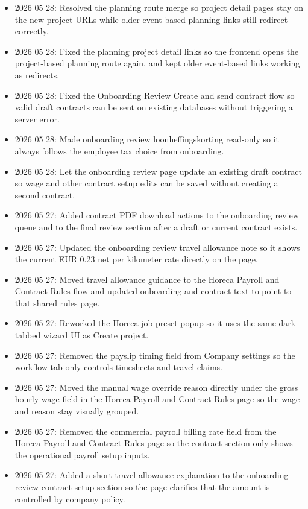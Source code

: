 \documentclass[11pt]{article}
\begin{document}
\begin{itemize}
    \item 2026 05 28: Resolved the planning route merge so project detail pages stay on the new project URLs while older event-based planning links still redirect correctly.
    \item 2026 05 28: Fixed the planning project detail links so the frontend opens the project-based planning route again, and kept older event-based links working as redirects.
    \item 2026 05 28: Fixed the Onboarding Review Create and send contract flow so valid draft contracts can be sent on existing databases without triggering a server error.
    \item 2026 05 28: Made onboarding review loonheffingskorting read-only so it always follows the employee tax choice from onboarding.
    \item 2026 05 28: Let the onboarding review page update an existing draft contract so wage and other contract setup edits can be saved without creating a second contract.
    \item 2026 05 27: Added contract PDF download actions to the onboarding review queue and to the final review section after a draft or current contract exists.
    \item 2026 05 27: Updated the onboarding review travel allowance note so it shows the current EUR 0.23 net per kilometer rate directly on the page.
    \item 2026 05 27: Moved travel allowance guidance to the Horeca Payroll and Contract Rules flow and updated onboarding and contract text to point to that shared rules page.
    \item 2026 05 27: Reworked the Horeca job preset popup so it uses the same dark tabbed wizard UI as Create project.
    \item 2026 05 27: Removed the payslip timing field from Company settings so the workflow tab only controls timesheets and travel claims.
    \item 2026 05 27: Moved the manual wage override reason directly under the gross hourly wage field in the Horeca Payroll and Contract Rules page so the wage and reason stay visually grouped.
    \item 2026 05 27: Removed the commercial payroll billing rate field from the Horeca Payroll and Contract Rules page so the contract section only shows the operational payroll setup inputs.
    \item 2026 05 27: Added a short travel allowance explanation to the onboarding review contract setup section so the page clarifies that the amount is controlled by company policy.

\end{itemize}
\end{document}
